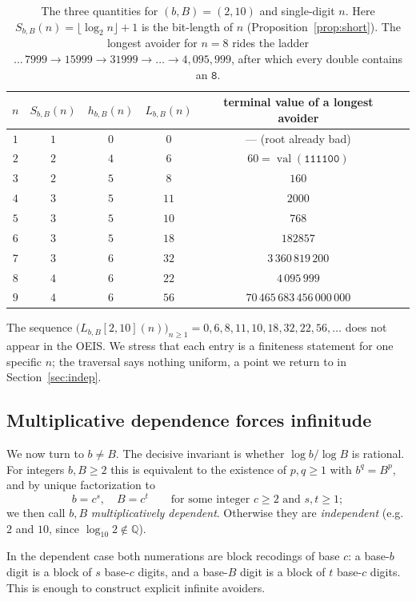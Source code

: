 \documentclass[11pt]{article}
\theoremstyle{plain}
\theoremstyle{definition}
\theoremstyle{remark}
\DeclareMathOperator{\val}{val}
\newcommand{\QQ}{\mathbb{Q}}
\newcommand{\Lbb}{L_{b,B}}
\newcommand{\Sbb}{S_{b,B}}
\newcommand{\hbb}{h_{b,B}}
\begin{document}
\begin{table}[h]
\centering
\begin{tabular}{cccccl}
\toprule
$n$ & $\Sbb(n)$ & $\hbb(n)$ & $\Lbb(n)$ & terminal value of a longest avoider \\
\midrule
$1$ & $1$ & $0$  & $0$  & --- (root already bad) \\
$2$ & $2$ & $4$  & $6$  & $60=\val(\texttt{111100})$ \\
$3$ & $2$ & $5$  & $8$  & $160$ \\
$4$ & $3$ & $5$  & $11$ & $2000$ \\
$5$ & $3$ & $5$  & $10$ & $768$ \\
$6$ & $3$ & $5$  & $18$ & $182857$ \\
$7$ & $3$ & $6$  & $32$ & $3\,360\,819\,200$ \\
$8$ & $4$ & $6$  & $22$ & $4\,095\,999$ \\
$9$ & $4$ & $6$  & $56$ & $70\,465\,683\,456\,000\,000$ \\
\bottomrule
\end{tabular}
\caption{The three quantities for $(b,B)=(2,10)$ and single-digit $n$. Here $\Sbb(n)=\lfloor\log_2 n\rfloor+1$ is the bit-length of $n$ (Proposition~\ref{prop:short}). The longest avoider for $n=8$ rides the ladder $\dots\,7999\to15999\to31999\to\dots\to4{,}095{,}999$, after which every double contains an $\texttt{8}$.}
\label{tab:2-10}
\end{table}

The sequence $\bigl(\Lbb[2,10](n)\bigr)_{n\ge1}=0,6,8,11,10,18,32,22,56,\dots$ does not appear in the OEIS. We stress that each entry is a finiteness statement for one specific $n$; the traversal says nothing uniform, a point we return to in Section~\ref{sec:indep}.

\subsection{Multiplicative dependence forces infinitude}

We now turn to $b\neq B$. The decisive invariant is whether $\log b/\log B$ is rational. For integers $b,B\ge2$ this is equivalent to the existence of $p,q\ge1$ with $b^{q}=B^{p}$, and by unique factorization to
\[
b=c^{s},\quad B=c^{t}\qquad\text{for some integer }c\ge 2\text{ and }s,t\ge1;
\]
we then call $b,B$ \emph{multiplicatively dependent}. Otherwise they are \emph{independent} (e.g.\ $2$ and $10$, since $\log_{10}2\notin\QQ$).

In the dependent case both numerations are block recodings of base $c$: a base-$b$ digit is a block of $s$ base-$c$ digits, and a base-$B$ digit is a block of $t$ base-$c$ digits. This is enough to construct explicit infinite avoiders.
\end{document}
